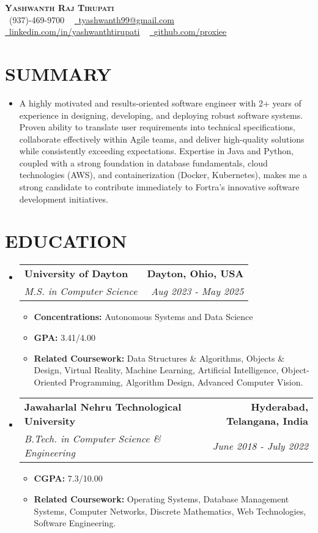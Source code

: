 \documentclass[letterpaper,11pt]{article}
\makeatletter
\newcommand{\resumeItem}[1]{\item\small{{#1 \vspace{-2pt}}}}
\newcommand{\resumeSubheading}[4]{\vspace{-2pt}\item\begin{tabular*}{0.97\textwidth}[t]{l@{\extracolsep{\fill}}r}\textbf{#1} & #2 \\\textit{\small#3} & \textit{\small #4} \\\end{tabular*}\vspace{-7pt}}
\newcommand{\resumeSubHeadingListStart}{\begin{itemize}[leftmargin=0.15in, label={}]}
\newcommand{\resumeSubHeadingListEnd}{\end{itemize}}
\newcommand{\resumeItemListStart}{\begin{itemize}}
\newcommand{\resumeItemListEnd}{\end{itemize}\vspace{-5pt}}
\makeatother
\begin{document}
\begin{center}
    \textbf{\Huge \scshape {\fontsize{15pt}{20pt}\selectfont Yashwanth Raj Tirupati}} \\ \vspace{1pt}
    \small \raisebox{-0.1\height}\faPhone\ (937)-469-9700 ~ \href{mailto:tyashwanth99@gmail.com}{\raisebox{-0.2\height}\faEnvelope\  \underline{tyashwanth99@gmail.com}} ~ 
    \href{https://linkedin.com/in/yashwanthtirupati}{\raisebox{-0.2\height}\faLinkedin\ \underline{linkedin.com/in/yashwanthtirupati}} ~ 
    \href{https://github.com/proxiee}{\raisebox{-0.2\height}\faGithub\ \underline{github.com/proxiee}}
    \vspace{-8pt}
\end{center}


\section{{\fontsize{9pt}{20pt}\selectfont \textbf{SUMMARY}}}
\resumeSubHeadingListStart

\resumeItem{A highly motivated and results-oriented software engineer with 2+ years of experience in designing, developing, and deploying robust software systems. Proven ability to translate user requirements into technical specifications, collaborate effectively within Agile teams, and deliver high-quality solutions while consistently exceeding expectations.  Expertise in Java and Python, coupled with a strong foundation in database fundamentals, cloud technologies (AWS), and containerization (Docker, Kubernetes), makes me a strong candidate to contribute immediately to Fortra's innovative software development initiatives.}
\resumeSubHeadingListEnd
\vspace{-18pt}

\section{{\fontsize{9pt}{20pt}\selectfont \textbf{EDUCATION}}}
\resumeSubHeadingListStart
\resumeSubheading{University of Dayton}{\textbf{Dayton, Ohio, USA}}{M.S. in Computer Science}{Aug 2023 - May 2025}
\resumeItemListStart
\resumeItem{\textbf{Concentrations:} Autonomous Systems and Data Science}
\resumeItem{\textbf{GPA:} 3.41/4.00}
\resumeItem{\textbf{Related Coursework:} Data Structures \& Algorithms, Objects \& Design, Virtual Reality, Machine Learning, Artificial Intelligence, Object-Oriented Programming, Algorithm Design, Advanced Computer Vision.}
\resumeItemListEnd
\resumeSubheading{Jawaharlal Nehru Technological University}{\textbf{Hyderabad, Telangana, India}}{B.Tech. in Computer Science \& Engineering}{June 2018 - July 2022}
\resumeItemListStart
\resumeItem{\textbf{CGPA:} 7.3/10.00}
\resumeItem{\textbf{Related Coursework:} Operating Systems, Database Management Systems, Computer Networks, Discrete Mathematics, Web Technologies, Software Engineering.}
\resumeItemListEnd
\resumeSubHeadingListEnd
\vspace{-18pt}
\end{document}
